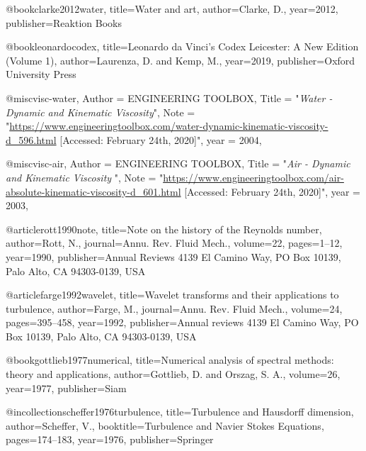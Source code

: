   @book{clarke2012water,
    title={{Water and art}},
    author={Clarke, D.},
    year={2012},
    publisher={Reaktion Books}
  }

  @book{leonardocodex,
    title={{Leonardo da Vinci's Codex Leicester: A New Edition (Volume 1)}},
    author={Laurenza, D. and Kemp, M.},
    year=2019,
    publisher={Oxford University Press}
  }


  @misc{visc-water,
        Author = {{EN\-GI\-NEER\-ING TOOL\-BOX}},
        Title  = "\emph{Water - Dynamic and Kinematic Viscosity}",
        Note   = "\url{https://www.engineeringtoolbox.com/water-dynamic-kinematic-viscosity-d_596.html} [Accessed: February 24th, 2020]",
        year = {2004},
    }

  @misc{visc-air,
        Author = {{ENGINEERING TOOLBOX}},
        Title  = "\emph{Air - Dynamic and Kinematic Viscosity }",
        Note   = "\url{https://www.engineeringtoolbox.com/air-absolute-kinematic-viscosity-d_601.html}   [Accessed: February 24th, 2020]",
        year = {2003},
    }


  @article{rott1990note,
    title={{Note on the history of the Reynolds number}},
    author={Rott, N.},
    journal={Annu. Rev. Fluid Mech.},
    volume={22},
    pages={1--12},
    year={1990},
    publisher={Annual Reviews 4139 El Camino Way, PO Box 10139, Palo Alto, CA 94303-0139, USA}
  }


  @article{farge1992wavelet,
    title={{Wavelet transforms and their applications to turbulence}},
    author={Farge, M.},
    journal={Annu. Rev. Fluid Mech.},
    volume={24},
    pages={395--458},
    year={1992},
    publisher={Annual reviews 4139 El Camino Way, PO Box 10139, Palo Alto, CA 94303-0139, USA}
  }


  @book{gottlieb1977numerical,
    title={{Numerical analysis of spectral methods: theory and applications}},
    author={Gottlieb, D. and Orszag, S. A.},
    volume={26},
    year={1977},
    publisher={Siam}
  }


  @incollection{scheffer1976turbulence,
    title={{Turbulence and Hausdorff dimension}},
    author={Scheffer, V.},
    booktitle={Turbulence and Navier Stokes Equations},
    pages={174--183},
    year={1976},
    publisher={Springer}
  }

